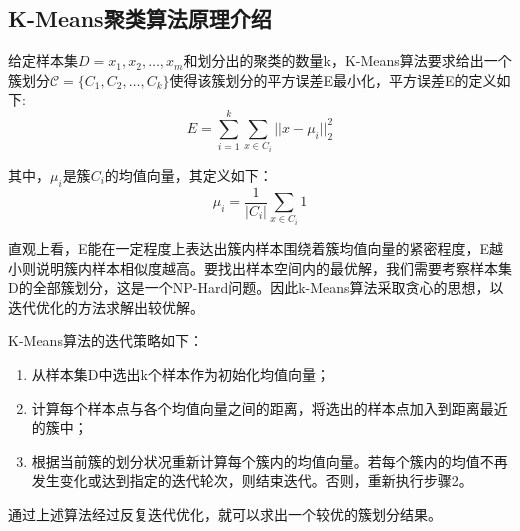 \documentclass[12pt]{article}
\begin{document}
\subsection{K-Means聚类算法原理介绍}
给定样本集$D={x_1,x_2,\dots,x_m}$和划分出的聚类的数量k，K-Means算法要求给出一个簇划分$\mathcal{C}=\{C_1,C_2,\dots,C_k\}$使得该簇划分的平方误差E最小化，平方误差E的定义如下:
\[E=\sum_{i=1}^k\sum_{x\in C_i}||x-\mu_i||_2^2\]\par
其中，$\mu_i$是簇$C_i$的均值向量，其定义如下：
\[\mu_i=\frac{1}{|C_i|}\sum_{x\in C_i}1\]\par
直观上看，E能在一定程度上表达出簇内样本围绕着簇均值向量的紧密程度，E越小则说明簇内样本相似度越高。要找出样本空间内的最优解，我们需要考察样本集D的全部簇划分，这是一个NP-Hard问题。因此k-Means算法采取贪心的思想，以迭代优化的方法求解出较优解。\par
K-Means算法的迭代策略如下：
\begin{enumerate}
    \item 从样本集D中选出k个样本作为初始化均值向量；
    \item 计算每个样本点与各个均值向量之间的距离，将选出的样本点加入到距离最近的簇中；
    \item 根据当前簇的划分状况重新计算每个簇内的均值向量。若每个簇内的均值不再发生变化或达到指定的迭代轮次，则结束迭代。否则，重新执行步骤2。
\end{enumerate}\par
通过上述算法经过反复迭代优化，就可以求出一个较优的簇划分结果。
\end{document}
